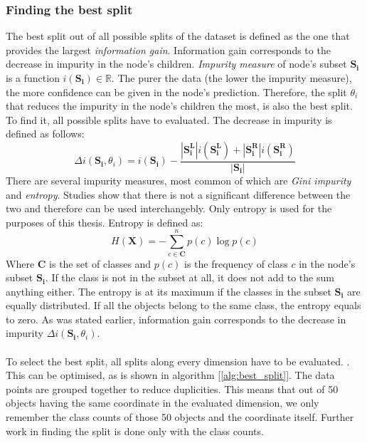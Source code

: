 \documentclass[11pt]{article}
\begin{document}
      \subsubsection{Finding the best split}
        \label{sec:split}
        The best split out of all possible splits of the dataset is defined as the one that provides the largest {\it information gain}. Information gain corresponds to the decrease in impurity in the node's children. {\it Impurity measure} of node's subset $\mathbf{S_i}$ is a function $i(\mathbf{S_i}) \in \mathbb{R}$. The purer the data (the lower the impurity measure), the more confidence can be given in the node's prediction. Therefore, the split $\theta_i$ that reduces the impurity in the node's children the most, is also the best split. To find it, all possible splits have to evaluated. The decrease in impurity is defined as follows:
        \begin{equation}
          \Delta i(\mathbf{S_i}, \theta_i) = i(\mathbf{S_i}) - \frac{|\mathbf{S_i^L}|i(\mathbf{S_i^L}) + |\mathbf{S_i^R}|i(\mathbf{S_i^R})}{|\mathbf{S_i}|}
        \end{equation}
        There are several impurity measures, most common of which are {\it Gini impurity} and {\it entropy}. Studies show that there is not a significant difference between the two and therefore can be used interchangebly. \cite{gini} Only entropy is used for the purposes of this thesis. Entropy is defined as:
        \begin{equation}
          H(\mathbf{X}) = - \sum_{c \in \mathbf{C}}^{n} p(c)\log{p(c)}
        \end{equation}
        Where $\mathbf{C}$ is the set of classes and $p(c)$ is the frequency of class $c$ in the node's subset $\mathbf{S_i}$. \cite{brabec} If the class is not in the subset at all, it does not add to the sum anything either. The entropy is at its maximum if the classes in the subset $\mathbf{S_i}$ are equally distributed. If all the objects belong to the same class, the entropy equals to zero. As was stated earlier, information gain corresponds to the decrease in impurity $\Delta i(\mathbf{S_i}, \theta_i)$. \cite{brabec}
        \\~\\
        To select the best split, all splits along every dimension have to be evaluated. \cite{brabec}. This can be optimised, as is shown in algorithm [\ref{alg:best_split}]. The data points are grouped together to reduce duplicities. This means that out of 50 objects having the same coordinate in the evaluated dimension, we only remember the class counts of those 50 objects and the coordinate itself. Further work in finding the split is done only with the class counts. \cite{brabec}
\end{document}
